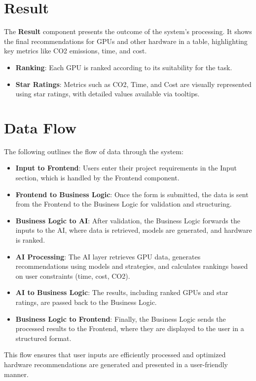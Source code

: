 \documentclass{report}
\begin{document}
\section{Result}
The \textbf{Result} component presents the outcome of the system’s processing. It shows the final recommendations for GPUs and other hardware in a table, highlighting key metrics like CO2 emissions, time, and cost.

\begin{itemize}
    \item \textbf{Ranking}: Each GPU is ranked according to its suitability for the task.
    \item \textbf{Star Ratings}: Metrics such as CO2, Time, and Cost are visually represented using star ratings, with detailed values available via tooltips.
\end{itemize}

\section{Data Flow}
The following outlines the flow of data through the system:

\begin{itemize}
    \item \textbf{Input to Frontend}: Users enter their project requirements in the Input section, which is handled by the Frontend component.
    \item \textbf{Frontend to Business Logic}: Once the form is submitted, the data is sent from the Frontend to the Business Logic for validation and structuring.
    \item \textbf{Business Logic to AI}: After validation, the Business Logic forwards the inputs to the AI, where data is retrieved, models are generated, and hardware is ranked.
    \item \textbf{AI Processing}: The AI layer retrieves GPU data, generates recommendations using models and strategies, and calculates rankings based on user constraints (time, cost, CO2).
    \item \textbf{AI to Business Logic}: The results, including ranked GPUs and star ratings, are passed back to the Business Logic.
    \item \textbf{Business Logic to Frontend}: Finally, the Business Logic sends the processed results to the Frontend, where they are displayed to the user in a structured format.
\end{itemize}

This flow ensures that user inputs are efficiently processed and optimized hardware recommendations are generated and presented in a user-friendly manner.
\end{document}

